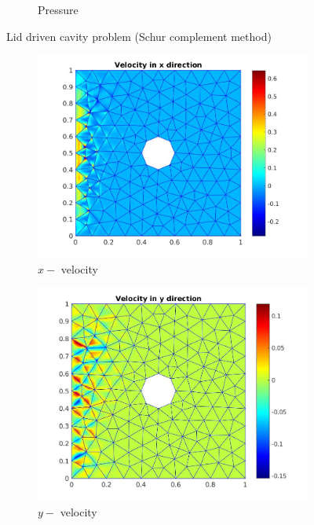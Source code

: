 \documentclass[a4paper,openany]{book}
\begin{document}
\begin{figure}
\begin{subfigure}{\textwidth}
    \caption{Pressure} 
    \label{pressure_stoke_schur_lid}
\end{subfigure}
\caption{Lid driven cavity problem (Schur complement method)}
\label{stoke_schur_lid}
\end{figure}

\begin{figure}
\begin{subfigure}{\textwidth}	
  \includegraphics[width=0.8\linewidth]{cylinder_bicgstab_vx.jpg}
      \caption{$x-$ velocity}
    \label{x_vel_stoke_bicgstab}
\end{subfigure}
\begin{subfigure}{\textwidth}	
      \includegraphics[width=0.8\linewidth]{cylinder_bicgstab_vy.jpg}
    \caption{$y-$ velocity}
     \label{y_vel_stoke_bicgstab}
\end{subfigure}
\begin{subfigure}{\textwidth}	

\end{subfigure}
\end{figure}
\end{document}
